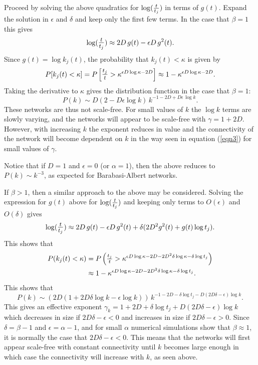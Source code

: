 \documentclass[12pt]{iopart}
\def\sfrac#1#2{\hbox{\normalsize $\frac{#1}{#2}$}}
\def\Sfrac#1#2{\hbox{\large$\frac{#1}{#2}$}}
\def\Ref#1{(\ref{#1})}
\begin{document}
Proceed by solving the above quadratics for $\log(\sfrac{t}{t_j})$ in terms of $g(t)$.  Expand the
solution in $\epsilon$ and $\delta$ and keep only the first few terms.  In the case that $\beta=1$
this gives
\begin{equation}
\log ( \Sfrac{t}{t_j} ) \approx 2D\,g(t) - \epsilon D \, g^2(t) .
\end{equation}
Since $g(t) = \log k_j(t)$, the probability that $k_j(t) < \kappa$ is given by
\begin{equation}
P[k_j(t) < \kappa] = P\left[\Sfrac{t_j}{t} > \kappa^{\epsilon D\log \kappa - 2D} \right]
\approx 1 - \kappa^{\epsilon D\log \kappa - 2D} .
\end{equation}
Taking the derivative to $\kappa$ gives the distribution function in the case that $\beta=1$:
\begin{equation}
P(k) \sim D(2-D\epsilon\log k)\, k^{-1-2D+D\epsilon\,\log k} .
\end{equation}
These networks are thus not scale-free.  For small values of $k$ the $\log k$ terms are slowly
varying, and the networks will appear to be scale-free with $\gamma=1+2D$.  However,
with increasing $k$ the exponent reduces in value and the connectivity of the network will
become dependent on $k$ in the way seen in equation \Ref{eqn3} for small values of $\gamma$.

Notice that if $D=1$ and $\epsilon=0$ (or $\alpha=1$), then the above reduces to $P(k) \sim k^{-3}$,
as expected for Barabasi-Albert networks.

If $\beta>1$, then a similar approach to the above may be considered.  Solving the expression
for $g(t)$ above for $\log( \sfrac{t}{t_j} )$ and keeping only terms to $O(\epsilon)$ and $O(\delta)$ gives
\begin{equation}
\log ( \Sfrac{t}{t_j} ) \approx 2D\,g(t) - \epsilon D \, g^2(t)  + \delta(2D^2 g^2(t) + g(t) \log t_j) .
\end{equation}
This shows that
\begin{eqnarray*}
P(k_j(t) < \kappa) &= P\left(\sfrac{t_j}{t} > \kappa^{\epsilon D\log \kappa - 2D
- 2D^2\delta\log \kappa - \delta\log t_j}  \right) \\
&\approx 1 -\kappa^{\epsilon D\log \kappa - 2D
- 2D^2\delta\log \kappa - \delta\log t_j} .
\end{eqnarray*}
This shows that
\begin{equation}
P(k) \sim (2D(1+2D\delta\log k - \epsilon \log k))\,
k^{-1-2D-\delta\log t_j - D(2D\delta-\epsilon)\log k} .
\end{equation}
This gives an effective exponent $\gamma_k = 1+2D+\delta\log t_j + D(2D\delta-\epsilon)\log k$
which decreases in size if $2D\delta - \epsilon < 0$ and increases in size if $2D\delta-\epsilon>0$.
Since $\delta=\beta-1$ and $\epsilon=\alpha-1$, and for small $\alpha$ numerical simulations
show that $\beta\approx 1$, it is normally the case that $2D\delta - \epsilon <0$.  This means
that the networks will first appear scale-free with constant connectivity until $k$ becomes
large enough in which case the connectivity will increase with $k$, as seen above.
\end{document}
